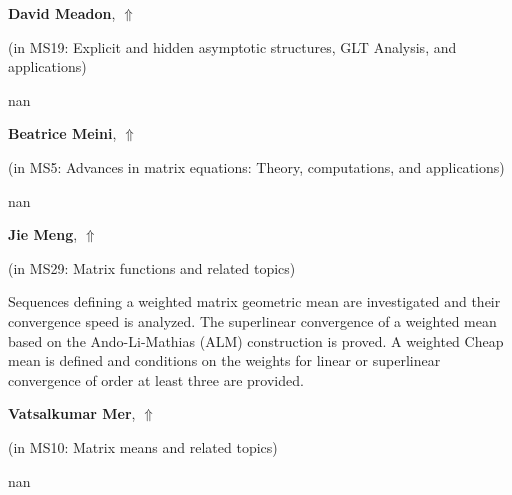 \documentclass[ILAS2025-program.tex]{subfiles}
\begin{document}
     \hypertarget{down0220}{}\begin{ilasabstract}
    
    \textbf{David Meadon},  \hfill \hyperlink{up0220}{$\Uparrow$}
    
    (in {\color{mstitle}MS19: Explicit and hidden asymptotic structures, GLT Analysis, and applications})
        
        \mtskip
    nan\end{ilasabstract}
     \hypertarget{down0064}{}\begin{ilasabstract}
    
    \textbf{Beatrice Meini},  \hfill \hyperlink{up0064}{$\Uparrow$}
    
    (in {\color{mstitle}MS5: Advances in matrix equations: Theory, computations, and applications})
        
        \mtskip
    nan\end{ilasabstract}
     \hypertarget{down0047}{}\begin{ilasabstract}
    
    \textbf{Jie Meng},  \hfill \hyperlink{up0047}{$\Uparrow$}
    
    (in {\color{mstitle}MS29: Matrix functions and related topics})
        
        \mtskip
    Sequences defining a weighted matrix geometric mean are investigated and their convergence speed is analyzed.
The superlinear convergence of a weighted mean based on the Ando-Li-Mathias (ALM) construction is proved. A weighted Cheap mean is defined and conditions on the weights for linear or superlinear convergence of order at least three are provided.
\end{ilasabstract}
     \hypertarget{down0056}{}\begin{ilasabstract}
    
    \textbf{Vatsalkumar Mer},  \hfill \hyperlink{up0056}{$\Uparrow$}
    
    (in {\color{mstitle}MS10: Matrix means and related topics})
        
        \mtskip
    nan\end{ilasabstract}
\end{document}
